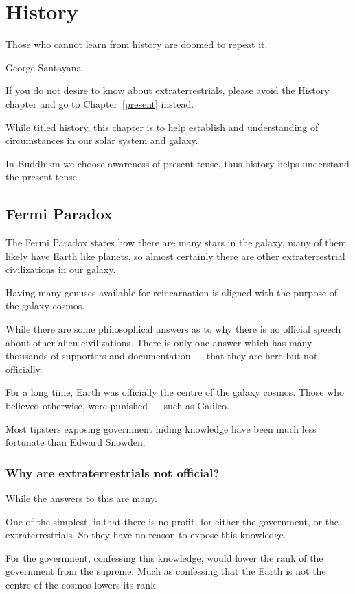 \documentclass{report}
\begin{document}
\chapter{History}

\epigraph{Those who cannot learn from history are doomed to repeat it.}
{George Santayana}

If you do not desire to know about extraterrestrials, please avoid the History
chapter and go to Chapter~\ref{present} instead.

While titled history, this chapter is to help establish and understanding of
circumstances in our solar system and galaxy.

In Buddhism we choose awareness of present-tense, thus history helps understand
the present-tense. 

\section{Fermi Paradox}
The Fermi Paradox states how there are many stars in the galaxy, many of them
likely have Earth like planets, so almost certainly there are other
extraterrestrial civilizations in our galaxy. 

Having many genuses available for reincarnation is aligned with the purpose of
the galaxy cosmos.

While there are some philosophical answers as to why there is no official speech 
about other alien civilizations. There is only one answer which has many
thousands of supporters and documentation --- that they are here but not 
officially. 

For a long time, Earth was officially the centre of the galaxy cosmos. Those who
believed otherwise, were punished --- such as Galileo.

Most tipsters exposing government hiding knowledge have been much less fortunate
 than Edward Snowden.

\subsection{Why are extraterrestrials not official?}
While the answers to this are many. 

One of the simplest, is that there is no profit, for either the government, or
the extraterrestrials.  So they have no reason to expose this knowledge.

For the government, confessing this knowledge, would lower the rank of the
government from the supreme. Much as confessing that the Earth is not the centre
of the cosmos lowers its rank.
\end{document}
